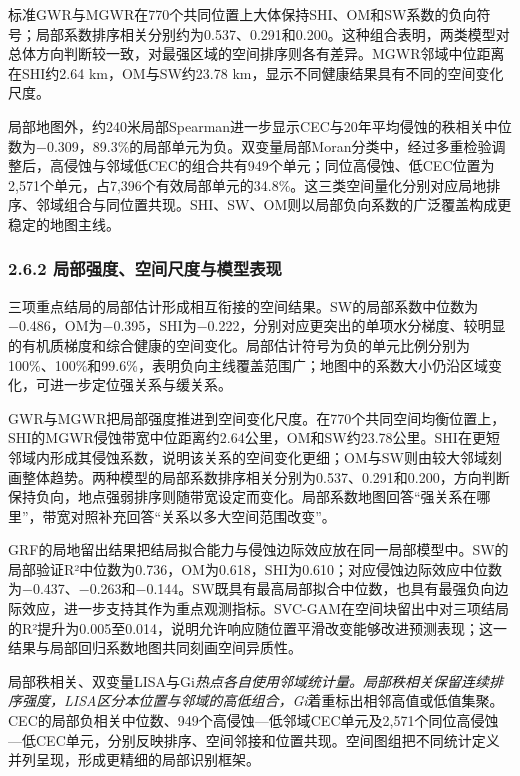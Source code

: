 \documentclass[
  11pt,
  a4paper,
]{ctexart}
\begin{document}
标准GWR与MGWR在770个共同位置上大体保持SHI、OM和SW系数的负向符号；局部系数排序相关分别约为0.537、0.291和0.200。这种组合表明，两类模型对总体方向判断较一致，对最强区域的空间排序则各有差异。MGWR邻域中位距离在SHI约2.64
km，OM与SW约23.78 km，显示不同健康结果具有不同的空间变化尺度。

局部地图外，约240米局部Spearman进一步显示CEC与20年平均侵蚀的秩相关中位数为−0.309，89.3\%的局部单元为负。双变量局部Moran分类中，经过多重检验调整后，高侵蚀与邻域低CEC的组合共有949个单元；同位高侵蚀、低CEC位置为2,571个单元，占7,396个有效局部单元的34.8\%。这三类空间量化分别对应局地排序、邻域组合与同位置共现。SHI、SW、OM则以局部负向系数的广泛覆盖构成更稳定的地图主线。

\hypertarget{ux5c40ux90e8ux5f3aux5ea6ux7a7aux95f4ux5c3aux5ea6ux4e0eux6a21ux578bux8868ux73b0}{%
\subsubsection{2.6.2
局部强度、空间尺度与模型表现}\label{ux5c40ux90e8ux5f3aux5ea6ux7a7aux95f4ux5c3aux5ea6ux4e0eux6a21ux578bux8868ux73b0}}

三项重点结局的局部估计形成相互衔接的空间结果。SW的局部系数中位数为−0.486，OM为−0.395，SHI为−0.222，分别对应更突出的单项水分梯度、较明显的有机质梯度和综合健康的空间变化。局部估计符号为负的单元比例分别为100\%、100\%和99.6\%，表明负向主线覆盖范围广；地图中的系数大小仍沿区域变化，可进一步定位强关系与缓关系。

GWR与MGWR把局部强度推进到空间变化尺度。在770个共同空间均衡位置上，SHI的MGWR侵蚀带宽中位距离约2.64公里，OM和SW约23.78公里。SHI在更短邻域内形成其侵蚀系数，说明该关系的空间变化更细；OM与SW则由较大邻域刻画整体趋势。两种模型的局部系数排序相关分别为0.537、0.291和0.200，方向判断保持负向，地点强弱排序则随带宽设定而变化。局部系数地图回答``强关系在哪里''，带宽对照补充回答``关系以多大空间范围改变''。

GRF的局地留出结果把结局拟合能力与侵蚀边际效应放在同一局部模型中。SW的局部验证R²中位数为0.736，OM为0.618，SHI为0.610；对应侵蚀边际效应中位数为−0.437、−0.263和−0.144。SW既具有最高局部拟合中位数，也具有最强负向边际效应，进一步支持其作为重点观测指标。SVC-GAM在空间块留出中对三项结局的R²提升为0.005至0.014，说明允许响应随位置平滑改变能够改进预测表现；这一结果与局部回归系数地图共同刻画空间异质性。

局部秩相关、双变量LISA与Gi\emph{热点各自使用邻域统计量。局部秩相关保留连续排序强度，LISA区分本位置与邻域的高低组合，Gi}着重标出相邻高值或低值集聚。CEC的局部负相关中位数、949个高侵蚀---低邻域CEC单元及2,571个同位高侵蚀---低CEC单元，分别反映排序、空间邻接和位置共现。空间图组把不同统计定义并列呈现，形成更精细的局部识别框架。
\end{document}
